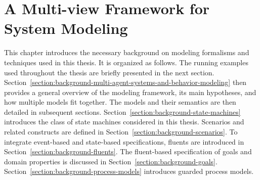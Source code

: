 \chapter{A Multi-view Framework for System Modeling\label{chapter:framework}}

This chapter introduces the necessary background on modeling formalisms and techniques used in this thesis. It is organized as follows. The running examples used throughout the thesis are briefly presented in the next section. Section~\ref{section:background-multi-agent-systems-and-behavior-modeling} then provides a general overview of the modeling framework, its main hypotheses, and how multiple models fit together. The models and their semantics are then detailed in subsequent sections. Section~\ref{section:background-state-machines} introduces the class of state machines considered in this thesis. Scenarios and related constructs are defined in Section~\ref{section:background-scenarios}. To integrate event-based and state-based specifications, fluents are introduced in Section~\ref{section:background-fluents}. The fluent-based specification of goals and domain properties is discussed in Section~\ref{section:background-goals}. Section~\ref{section:background-process-models} introduces guarded process models.









